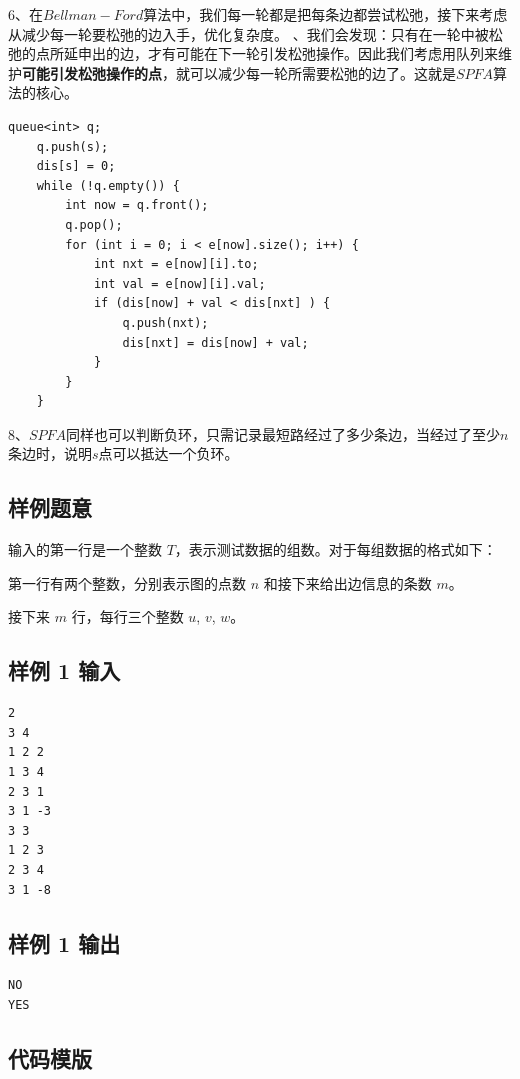 \documentclass{article}
\begin{document}
    6、在$Bellman-Ford$算法中，我们每一轮都是把每条边都尝试松弛，接下来考虑从减少每一轮要松弛的边入手，优化复杂度。
、我们会发现：只有在一轮中被松弛的点所延申出的边，才有可能在下一轮引发松弛操作。因此我们考虑用队列来维护\textbf{可能引发松弛操作的点}，就可以减少每一轮所需要松弛的边了。这就是$SPFA$算法的核心。
     \begin{lstlisting}[style = code]
    queue<int> q;
    q.push(s);
    dis[s] = 0;
    while (!q.empty()) {
        int now = q.front();
        q.pop();
        for (int i = 0; i < e[now].size(); i++) {
            int nxt = e[now][i].to;
            int val = e[now][i].val;
            if (dis[now] + val < dis[nxt] ) {
                q.push(nxt);
                dis[nxt] = dis[now] + val;
            }
        }
    }\end{lstlisting}
    
    8、$SPFA$同样也可以判断负环，只需记录最短路经过了多少条边，当经过了至少$n$条边时，说明$s$点可以抵达一个负环。
    \newpage
    \subsection{样例题意}
输入的第一行是一个整数 $T$，表示测试数据的组数。对于每组数据的格式如下：

第一行有两个整数，分别表示图的点数 $n$ 和接下来给出边信息的条数 $m$。

接下来 $m$ 行，每行三个整数 $u$, $v$, $w$。
 \subsection{样例 1 输入} %

\begin{lstlisting}[style = sample]
2
3 4
1 2 2
1 3 4
2 3 1
3 1 -3
3 3
1 2 3
2 3 4
3 1 -8
\end{lstlisting}
    
    
    \subsection{样例 1 输出}
    
\begin{lstlisting}[style = sample]
NO
YES
\end{lstlisting}
    

    \newpage
    \subsection{代码模版} 
\end{document}

